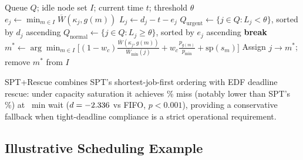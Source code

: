\begin{algorithm}[H]
\caption{SPT+Rescue Scheduler}
\label{alg:sptrescue}
\begin{algorithmic}[1]
\REQUIRE Queue $Q$; idle node set $I$; current time $t$; threshold $\theta$
  \STATE $e_j \leftarrow \min_{m \in I} \overline{W}(\kappa_j, g(m))$ 
  \STATE $L_j \leftarrow d_j - t - e_j$
\ENDFOR
\STATE $Q_{\text{urgent}} \leftarrow \{j \in Q : L_j < \theta\}$, sorted by $d_j$ ascending
\STATE $Q_{\text{normal}} \leftarrow \{j \in Q : L_j \geq \theta\}$, sorted by $e_j$ ascending
   \STATE \textbf{break} \ENDIF
  \STATE $m^* \leftarrow \arg\min_{m \in I} \big[(1{-}w_c)\tfrac{\overline{W}(\kappa_j, g(m))}{\overline{W}_{\min}(j)} + w_c\tfrac{p_{g(m)}}{p_{\min}} + \text{sp}(s_m)\big]$ 
  \STATE Assign $j \to m^*$; remove $m^*$ from $I$
\ENDFOR
\end{algorithmic}
\end{algorithm}

SPT+Rescue combines SPT's shortest-job-first ordering with EDF deadline rescue: under capacity saturation it achieves \RescueMiss\% miss (notably lower than SPT's \SPTmiss\%) at \RescueWait~min wait ($d=-2.336$ vs FIFO, $p<0.001$), providing a conservative fallback when tight-deadline compliance is a strict operational requirement.

\subsection{Illustrative Scheduling Example}
\label{ssec:illustrative-scheduling-example}

